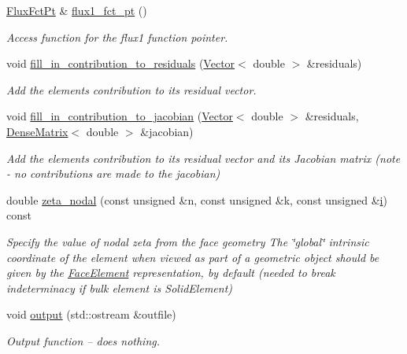\begin{DoxyCompactItemize}
\hyperlink{classoomph_1_1BiharmonicFluxElement_a0fafeac48951b37cf5cd86aa486945a8}{Flux\+Fct\+Pt} \& \hyperlink{classoomph_1_1BiharmonicFluxElement_a9bb55fe653d5690cc7e53ae8385a8264}{flux1\+\_\+fct\+\_\+pt} ()
\begin{DoxyCompactList}\small\item\em Access function for the flux1 function pointer. \end{DoxyCompactList}\item 
void \hyperlink{classoomph_1_1BiharmonicFluxElement_ac957e958c25b7ecede49aac5393240f2}{fill\+\_\+in\+\_\+contribution\+\_\+to\+\_\+residuals} (\hyperlink{classoomph_1_1Vector}{Vector}$<$ double $>$ \&residuals)
\begin{DoxyCompactList}\small\item\em Add the element\textquotesingle{}s contribution to its residual vector. \end{DoxyCompactList}\item 
void \hyperlink{classoomph_1_1BiharmonicFluxElement_a2d9f3025aa3d9e941a95e2d2ca7f86ce}{fill\+\_\+in\+\_\+contribution\+\_\+to\+\_\+jacobian} (\hyperlink{classoomph_1_1Vector}{Vector}$<$ double $>$ \&residuals, \hyperlink{classoomph_1_1DenseMatrix}{Dense\+Matrix}$<$ double $>$ \&jacobian)
\begin{DoxyCompactList}\small\item\em Add the element\textquotesingle{}s contribution to its residual vector and its Jacobian matrix (note -\/ no contributions are made to the jacobian) \end{DoxyCompactList}\item 
double \hyperlink{classoomph_1_1BiharmonicFluxElement_af4c405bca7989f8609926279fdf09f0f}{zeta\+\_\+nodal} (const unsigned \&n, const unsigned \&k, const unsigned \&\hyperlink{cfortran_8h_adb50e893b86b3e55e751a42eab3cba82}{i}) const
\begin{DoxyCompactList}\small\item\em Specify the value of nodal zeta from the face geometry The \char`\"{}global\char`\"{} intrinsic coordinate of the element when viewed as part of a geometric object should be given by the \hyperlink{classoomph_1_1FaceElement}{Face\+Element} representation, by default (needed to break indeterminacy if bulk element is Solid\+Element) \end{DoxyCompactList}\item 
void \hyperlink{classoomph_1_1BiharmonicFluxElement_a04c4c197b9a2e0be02a9c84a5c6d6e2a}{output} (std\+::ostream \&outfile)
\begin{DoxyCompactList}\small\item\em Output function -- does nothing. \end{DoxyCompactList}\item 

\end{DoxyCompactItemize}
